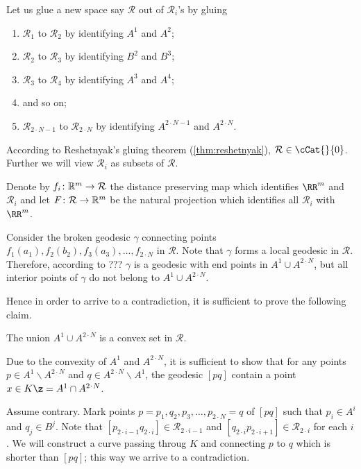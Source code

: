 Let us glue a new space say $\mathcal{R}$ out of $\mathcal{R}_i$'s
by gluing 
\begin{enumerate}
\item $\mathcal{R}_1$ to $\mathcal{R}_2$ by identifying $A^1$ and $A^2$;
\item $\mathcal{R}_2$ to $\mathcal{R}_3$  by identifying $B^2$ and $B^3$;
\item $\mathcal{R}_3$ to $\mathcal{R}_4$  by identifying $A^3$ and $A^4$;
\item and so on;
\item $\mathcal{R}_{2\cdot N-1}$ to $\mathcal{R}_{2\cdot N}$ by identifying $A^{2\cdot N-1}$ and $A^{2\cdot N}$.
\end{enumerate}
According to Reshetnyak's gluing theorem (\ref{thm:reshetnyak}), $\mathcal{R}\in\cCat{}{0}$.
Further we will view $\mathcal{R}_i$ as subsets of $\mathcal{R}$.

Denote by $f_i\:\RR^m\to\mathcal{R}$ the distance preserving map which identifies $\RR^m$ and $\mathcal{R}_i$
and let $F\:\mathcal{R} \to \RR^m$ be the natural projection which identifies all $\mathcal{R}_i$ with $\RR^m$.

Consider the broken geodesic $\gamma$ connecting points $f_1(a_1),f_2(b_2),f_3(a_3),\dots,f_{2\cdot N}$ in $\mathcal{R}$.
Note that $\gamma$ forms a local geodesic in $\mathcal{R}$.
Therefore, according to ??? $\gamma$ is a geodesic with end points in $A^1\cup A^{2\cdot N}$,
but all interior points of $\gamma$ do not belong to $A^1\cup A^{2\cdot N}$.

Hence in order to arrive to a contradiction, 
it is sufficient to prove the following claim.
 
\begin{clm}{}
The union $A^1\cup A^{2\cdot N}$ is a convex set in $\mathcal{R}$.
\end{clm}

Due to the convexity of $A^1$ and $A^{2\cdot N}$,
it is sufficient to show that for any points $p\in A^1\backslash A^{2\cdot N}$ and $q\in A^{2\cdot N}\backslash A^1$,
the geodesic $[pq]$ contain a point $x\in K\z=A^1\cap A^{2\cdot N}$.

Assume contrary.
Mark points $p=p_1,q_2,p_3,\dots,p_{2\cdot N}=q$ of $[pq]$ such that $p_i\in A^i$ and $q_j\in B^j$.
Note that $[p_{2\cdot i-1}q_{2\cdot i}]\in \mathcal{R}_{2\cdot i-1}$ 
and 
$[q_{2\cdot i}p_{2\cdot i+1}]\in \mathcal{R}_{2\cdot i}$ for each $i$.
We will construct a curve passing throug $K$ and connecting $p$ to $q$ which is shorter than $[pq]$;
this way we arrive to a contradiction. 







\qeds
